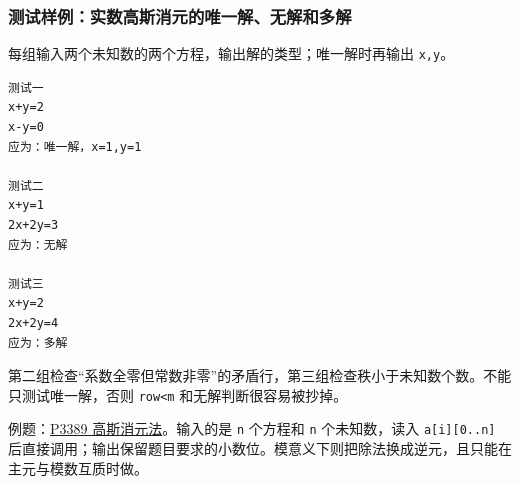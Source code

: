 \subsubsection{测试样例：实数高斯消元的唯一解、无解和多解}

每组输入两个未知数的两个方程，输出解的类型；唯一解时再输出 \passthrough{\lstinline!x,y!}。

\begin{lstlisting}
测试一
x+y=2
x-y=0
应为：唯一解，x=1,y=1

测试二
x+y=1
2x+2y=3
应为：无解

测试三
x+y=2
2x+2y=4
应为：多解
\end{lstlisting}

第二组检查``系数全零但常数非零''的矛盾行，第三组检查秩小于未知数个数。不能只测试唯一解，否则 \passthrough{\lstinline!row<m!} 和无解判断很容易被抄掉。

例题：\href{https://www.luogu.com.cn/problem/P3389}{P3389 高斯消元法}。输入的是 \passthrough{\lstinline!n!} 个方程和 \passthrough{\lstinline!n!} 个未知数，读入 \passthrough{\lstinline!a[i][0..n]!} 后直接调用；输出保留题目要求的小数位。模意义下则把除法换成逆元，且只能在主元与模数互质时做。
